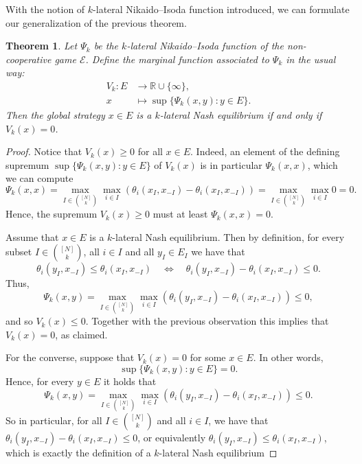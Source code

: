 \documentclass[a4paper,11pt,reqno,english]{amsart}
\theoremstyle{plain}
\newtheorem{theorem}{Theorem}[section]
\theoremstyle{definition}
\newcommand{\Ecal}{\mathcal{E}}
\begin{document}
\medskip
With the notion of $k$-lateral Nikaido--Isoda function introduced, we can formulate our generalization of the previous theorem.

\begin{theorem}\label{thm:MultilateralNikaidoIsodaTheorem}
	Let $\Psi_k$ be the $k$-lateral Nikaido--Isoda function of the non-cooperative game $\Ecal$.
	Define the marginal function associated to $\Psi_k$ in the usual way:
	\begin{align*}
		V_k\colon E & \longrightarrow \mathbb{R} \cup \{\infty\}, \\
		x           & \longmapsto \sup\{\Psi_k(x,y) : y\in E\}.
	\end{align*}
	Then the global strategy $x\in E$ is a $k$-lateral Nash equilibrium if and only if $V_k(x)=0$.
\end{theorem}
\begin{proof}
	Notice that $V_k(x) \geq 0$ for all $x\in E$. Indeed, an element of the defining supremum $\sup\{\Psi_k(x,y) : y\in E\}$ of $V_k(x)$ is in particular $\Psi_k(x,x)$, which we can compute
	\begin{displaymath}
		\Psi_k(x,x) =\max_{I\in\binom{[N]}{k}}\max_{i\in I}\left(\theta_i(x_I, x_{-I}) - \theta_i(x_I, x_{-I})\right) = \max_{I\in\binom{[N]}{k}}\max_{i\in I} 0 = 0.
	\end{displaymath}
	Hence, the supremum $V_k(x) \geq 0$ must at least $\Psi_k(x,x)=0$.

	\medskip
	Assume that $x\in E$ is a $k$-lateral Nash equilibrium. Then by definition, for every subset $I\in\binom{[N]}{k}$, all $i\in I$ and all $y_I\in E_I$ we have that
	\begin{displaymath}
		\theta_i(y_I,x_{-I}) \leq \theta_i(x_I,x_{-I}) \quad \Longleftrightarrow \quad \theta_i(y_I,x_{-I}) - \theta_i(x_I,x_{-I}) \leq 0.
	\end{displaymath}
	Thus,
	\begin{displaymath}
		\Psi_k(x,y)=\max_{I\in\binom{[N]}{k}}\max_{i\in I}\left(\theta_i(y_I, x_{-I}) - \theta_i(x_I, x_{-I})\right) \leq 0,
	\end{displaymath}
	and so $V_k(x)\leq 0$.
	Together with the previous observation this implies that $V_k(x)= 0$, as claimed.

	\medskip
	For the converse, suppose that $V_k(x)=0$ for some $x\in E$.
	In other words,
	\begin{displaymath}
		\sup\{\Psi_k(x,y) : y\in E\}=0.
	\end{displaymath}
	Hence, for every $y\in E$ it holds that
	\begin{displaymath}
		\Psi_k(x,y) =\max_{I\in\binom{[N]}{k}}\max_{i\in I}\left(\theta_i(y_I, x_{-I}) - \theta_i(x_I, x_{-I})\right) \leq 0.
	\end{displaymath}
	So in particular, for all $I\in\binom{[N]}{k}$ and all $i\in I$, we have that $\theta_i(y_I, x_{-I}) - \theta_i(x_I, x_{-I})\leq 0$, or equivalently $\theta_i(y_I, x_{-I}) \leq\theta_i(x_I, x_{-I})$, which is exactly the definition of a $k$-lateral Nash equilibrium
\end{proof}
\end{document}
